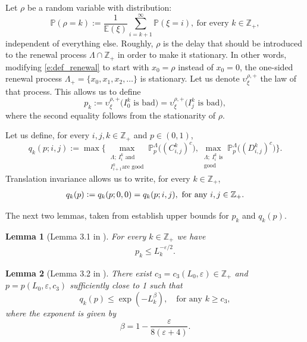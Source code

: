 \documentclass[a4paper,oneside,12pt]{amsart}
\renewcommand{\leq}{\leqslant}
\renewcommand{\geq}{\geqslant}
\theoremstyle{plain}
\newtheorem{lemma}{Lemma}
\theoremstyle{definition}
\theoremstyle{remark}
\begin{document}
Let $\rho$ be a random variable with distribution:
\begin{equation}
\label{e:stat_delay}
\mathbb{P}(\rho=k):=\dfrac{1}{\mathbb{E}(\xi)}\sum_{i=k+1}^{\infty}\mathbb{P}(\xi=i),\ \textrm{for every }k\in\mathbb{Z}_+,
\end{equation}
independent of everything else.
Roughly, $\rho$ is the delay that should be introduced to the renewal process $\Lambda \cap \mathbb{Z}_+$ in order to make it stationary.
In other words, modifying \eqref{e:def_renewal} to start with $x_0 = \rho$ instead of $x_0 = 0$, the one-sided renewal process $\Lambda_+ = \{x_0, x_1, x_2, \ldots\}$ is stationary.
Let us denote $\upsilon_\xi^{\rho,+}$ the law of that process.
This allows us to define
\begin{equation}
p_k:=\upsilon^{\rho,+}_\xi\big(\text{$I_0^k$ is bad}\big)=\upsilon^{\rho,+}_\xi\big(\text{$I_j^k$ is bad}\big),
\end{equation}
where the second equality follows from the stationarity of $\rho$.

Let us define, for every $i, j, k \in \mathbb{Z}_+$ and $p\in(0,1)$,
\begin{equation}
\label{eq:def_qk}
q_k(p; i,j):=\max\Bigg\{\underset{\substack{ \Lambda; \ I^k_i \textrm{ and }\\ I^k_{i+1}\textrm{are good}}}{\max}\mathbb{P}^\Lambda_p\big((C_{i,j}^k)^c\big), \underset{\substack{ \Lambda; \ I^k_i \textrm{ is} \\ \textrm{good}}}{\max} \mathbb{P}^\Lambda_p\big((D_{i, j}^k)^c\big) \Bigg\}.
\end{equation}
Translation invariance allows us to write, for every $k \in \mathbb{Z}_+$,
\begin{eqnarray}
\label{eq:qk_inv}
q_k(p)\vcentcolon=q_k(p;0,0) = q_k(p; i, j), \textrm{ for any }i, j \in \mathbb{Z}_+.
\end{eqnarray}

The next two lemmas, taken from \cite{Hilario2023} establish upper bounds for $p_k$ and $q_k(p)$.

\begin{lemma}[Lemma 3.1 in \cite{Hilario2023}]
\label{l:p_k}
For every $k\in\mathbb{Z}_+$ we have
\begin{eqnarray}
\label{e:ctrl_env} 
p_k\leq L_k^{-\varepsilon/2}.
\end{eqnarray}
\end{lemma}

\begin{lemma}[Lemma 3.2 in \cite{Hilario2023}]
\label{l:ctrl_cross}
There exist $c_3=c_3(L_0, \varepsilon)\in\mathbb{Z}_+$ and $p=p(L_0, \varepsilon, c_3)$ sufficiently close to 1 such that
\begin{equation}
q_k(p) \leq \exp(-L_k^{\beta}), \,\,\,\, \textrm{ for any }k\geq c_3,
\end{equation}
where the exponent is given by
\begin{equation}
\label{e:def_beta}
\beta = 1- \frac{\varepsilon}{8(\varepsilon+4)}.
\end{equation}
\end{lemma}
\end{document}
